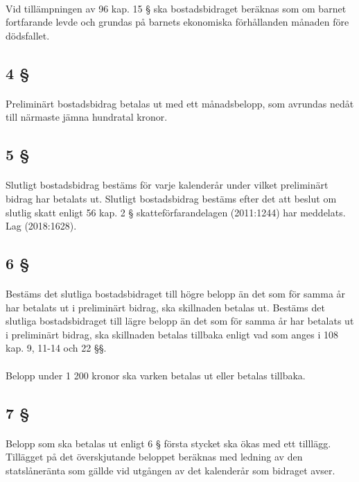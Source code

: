 \documentclass[a4paper,notitlepage,openany,10pt]{book}
\begin{document}
\paragraph*{}
Vid tillämpningen av 96 kap. 15 § ska bostadsbidraget beräknas som om barnet fortfarande levde och grundas på barnets ekonomiska förhållanden månaden före dödsfallet.
\subsection*{4 §}
\paragraph*{}
Preliminärt bostadsbidrag betalas ut med ett månadsbelopp, som avrundas nedåt till närmaste jämna hundratal kronor.
\subsection*{5 §}
\paragraph*{}
Slutligt bostadsbidrag bestäms för varje kalenderår under vilket preliminärt bidrag har betalats ut. Slutligt bostadsbidrag bestäms efter det att beslut om slutlig skatt enligt 56 kap. 2 § skatteförfarandelagen (2011:1244) har meddelats.
Lag (2018:1628).
\subsection*{6 §}
\paragraph*{}
Bestäms det slutliga bostadsbidraget till högre belopp än det som för samma år har betalats ut i preliminärt bidrag, ska skillnaden betalas ut. Bestäms det slutliga bostadsbidraget till lägre belopp än det som för samma år har betalats ut i preliminärt bidrag, ska skillnaden betalas tillbaka enligt vad som anges i 108 kap. 9, 11-14 och 22 §§.
\paragraph*{}
Belopp under 1 200 kronor ska varken betalas ut eller betalas tillbaka.
\subsection*{7 §}
\paragraph*{}
Belopp som ska betalas ut enligt 6 § första stycket ska ökas med ett tilllägg. Tillägget på det överskjutande beloppet beräknas med ledning av den statslåneränta som gällde vid utgången av det kalenderår som bidraget avser.
\end{document}

